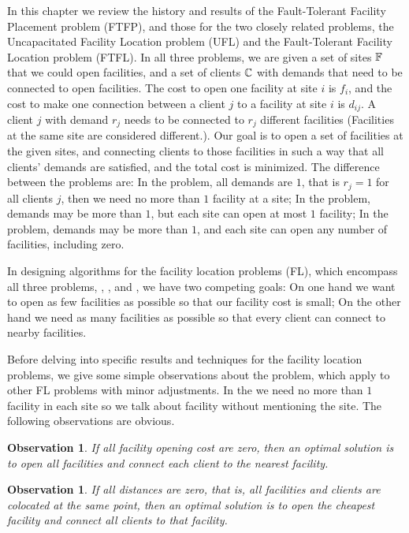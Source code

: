 \documentclass[oneside,final]{ucr}
\newtheorem{observation}[theorem]{Observation}
\begin{document}
In this chapter we review the history and results of the
Fault-Tolerant Facility Placement problem (FTFP), and those
for the two closely related problems, the Uncapacitated
Facility Location problem (UFL) and the Fault-Tolerant
Facility Location problem (FTFL). In all three problems, we
are given a set of sites $\mathbb{F}$ that we could open
facilities, and a set of clients $\mathbb{C}$ with demands
that need to be connected to open facilities. The cost to
open one facility at site $i$ is $f_i$, and the cost to make
one connection between a client $j$ to a facility at site
$i$ is $d_{ij}$. A client $j$ with demand $r_j$ needs to be
connected to $r_j$ different facilities (Facilities at the
same site are considered different.). Our goal is to open a
set of facilities at the given sites, and connecting clients
to those facilities in such a way that all clients' demands
are satisfied, and the total cost is minimized. The
difference between the problems are: In the {\UFL} problem,
all demands are $1$, that is $r_j=1$ for all clients $j$,
then we need no more than $1$ facility at a site; In the
{\FTFL} problem, demands may be more than $1$, but each site
can open at most $1$ facility; In the {\FTFP} problem,
demands may be more than $1$, and each site can open any
number of facilities, including zero.

In designing algorithms for the facility location problems
(FL), which encompass all three problems, {\UFL}, {\FTFL},
and {\FTFP}, we have two competing goals: On one hand we
want to open as few facilities as possible so that our
facility cost is small; On the other hand we need as many
facilities as possible so that every client can connect to
nearby facilities.

Before delving into specific results and techniques for the
facility location problems, we give some simple observations
about the {\UFL} problem, which apply to other FL problems
with minor adjustments. In the {\UFL} we need no more than
$1$ facility in each site so we talk about facility without
mentioning the site. The following observations are obvious.

\begin{observation}
  If all facility opening cost are zero, then an optimal
  solution is to open all facilities and connect each client
  to the nearest facility.
\end{observation}

\begin{observation}
  If all distances are zero, that is, all facilities and
  clients are colocated at the same point, then an optimal
  solution is to open the cheapest facility and connect all
  clients to that facility.
\end{observation}
\end{document}
